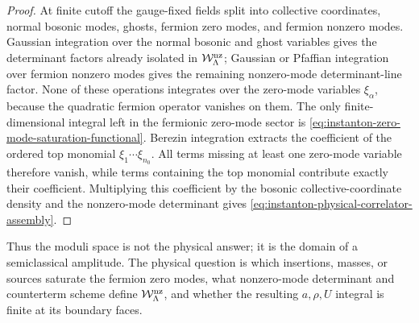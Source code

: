\begin{proof}
At finite cutoff the gauge-fixed fields split into collective coordinates,
normal bosonic modes, ghosts, fermion zero modes, and fermion nonzero modes.
Gaussian integration over the normal bosonic and ghost variables gives the
determinant factors already isolated in
\(\mathcal W_{\Lambda}^{\rm nz}\); Gaussian or Pfaffian integration over
fermion nonzero modes gives the remaining nonzero-mode determinant-line
factor.  None of these operations integrates over the zero-mode variables
\(\xi_\alpha\), because the quadratic fermion operator vanishes on them.
The only finite-dimensional integral left in the fermionic zero-mode sector is
\eqref{eq:instanton-zero-mode-saturation-functional}.  Berezin integration
extracts the coefficient of the ordered top monomial
\(\xi_1\cdots\xi_{n_0}\).  All terms missing at least one zero-mode variable
therefore vanish, while terms containing the top monomial contribute exactly
their coefficient.  Multiplying this coefficient by the bosonic
collective-coordinate density and the nonzero-mode determinant gives
\eqref{eq:instanton-physical-correlator-assembly}.
\end{proof}

Thus the moduli space is not the physical answer; it is the domain of a
semiclassical amplitude.  The physical question is which insertions, masses,
or sources saturate the fermion zero modes, what nonzero-mode determinant and
counterterm scheme define \(\mathcal W_{\Lambda}^{\rm nz}\), and whether the
resulting \(a,\rho,U\) integral is finite at its boundary faces.

